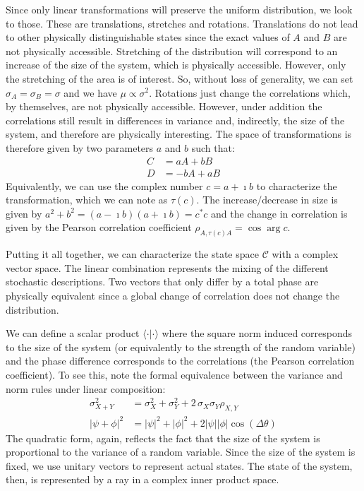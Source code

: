 \documentclass[11pt,letterpaper,fleqn]{memoir} %
\begin{document}
Since only linear transformations will preserve the uniform distribution, we look to those. These are translations, stretches and rotations. Translations do not lead to other physically distinguishable states since the exact values of $A$ and $B$ are not physically accessible. Stretching of the distribution will correspond to an increase of the size of the system, which is physically accessible. However, only the stretching of the area is of interest. So, without loss of generality, we can set $\sigma_A = \sigma_B = \sigma$ and we have $\mu \propto \sigma^2$. Rotations just change the correlations which, by themselves, are not physically accessible. However, under addition the correlations still result in differences in variance and, indirectly, the size of the system, and therefore are physically interesting. The space of transformations is therefore given by two parameters $a$ and $b$ such that:
\begin{equation}
\begin{aligned}
C &= a A + b B \\
D &= -b A + a B
\end{aligned}
\end{equation}
Equivalently, we can use the complex number $c = a + \imath b$ to characterize the transformation, which we can note as $\tau(c)$. The increase/decrease in size is given by $a^2 + b^2 = (a - \imath b) (a + \imath b) = c^* c$ and the change in correlation is given by the Pearson correlation coefficient $\rho_{A,\tau(c) A} = \cos \arg c$.

Putting it all together, we can characterize the state space $\mathcal{C}$ with a complex vector space. The linear combination represents the mixing of the different stochastic descriptions. Two vectors that only differ by a total phase are physically equivalent since a global change of correlation does not change the distribution.

We can define a scalar product $\langle \cdot | \cdot \rangle$ where the square norm induced corresponds to the size of the system (or equivalently to the strength of the random variable) and the phase difference corresponds to the correlations (the Pearson correlation coefficient). To see this, note the formal equivalence between the variance and norm rules under linear composition:
\begin{equation}
\begin{aligned}
\sigma^2_{X+Y} &= \sigma^2_{X} + \sigma^2_{Y} + 2 \, \sigma_{X} \sigma_{Y} \rho_{X,Y} \\
|\psi+\phi|^2&=|\psi|^2 + |\phi|^2 + 2 |\psi||\phi|\cos(\Delta \theta)
\end{aligned}
\end{equation}
The quadratic form, again, reflects the fact that the size of the system is proportional to the variance of a random variable. Since the size of the system is fixed, we use unitary vectors to represent actual states. The state of the system, then, is represented by a ray in a complex inner product space.
\end{document}
